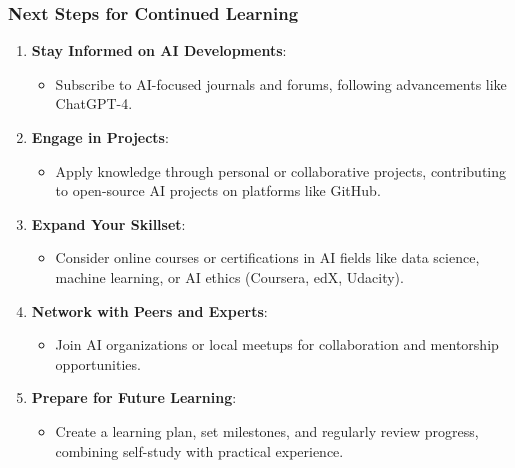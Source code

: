 \documentclass[aspectratio=169]{beamer}
\begin{document}
\begin{frame}[fragile]
    \frametitle{Next Steps for Continued Learning}
    \begin{enumerate}
        \item \textbf{Stay Informed on AI Developments}:
        \begin{itemize}
            \item Subscribe to AI-focused journals and forums, following advancements like ChatGPT-4.
        \end{itemize}

        \item \textbf{Engage in Projects}:
        \begin{itemize}
            \item Apply knowledge through personal or collaborative projects, contributing to open-source AI projects on platforms like GitHub.
        \end{itemize}

        \item \textbf{Expand Your Skillset}:
        \begin{itemize}
            \item Consider online courses or certifications in AI fields like data science, machine learning, or AI ethics (Coursera, edX, Udacity).
        \end{itemize}

        \item \textbf{Network with Peers and Experts}:
        \begin{itemize}
            \item Join AI organizations or local meetups for collaboration and mentorship opportunities.
        \end{itemize}

        \item \textbf{Prepare for Future Learning}:
        \begin{itemize}
            \item Create a learning plan, set milestones, and regularly review progress, combining self-study with practical experience.
        \end{itemize}
    \end{enumerate}
\end{frame}
\end{document}
